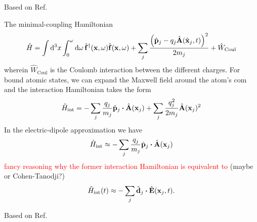 Based on Ref.~\cite[p.~48]{Vogel2006}

The minimal-coupling Hamiltonian
\begin{equation}
	\hat{H}
	=
	\int\dd[3]{x}
	\int_0^\omega\dd{\omega}
	\hat{\vb{f}}^\dagger(\vb{x},\omega)
	\hat{\vb{f}}(\vb{x},\omega)
	+
	\sum_j\frac{\left(\hat{\vb{p}}_j-q_j\hat{\vb{A}}(\hat{\vb{x}}_j,t)\right)^2}{2m_j}
	+
	\hat{W}_\text{Coul}
\end{equation}
wherein $\hat{W}_\text{Coul}$ is the Coulomb interaction between the different charges.
For bound atomic states, we can expand the Maxwell field around the atom's \gls{com} and the interaction Hamiltonian takes the form
\begin{equation}
	\hat{H}_\text{int}
	=
	-
	\sum_j\frac{q_j}{m_j}
	\hat{\vb{p}}_j
	\vdot
	\hat{\vb{A}}(\vb{x}_j)
	+
	\sum_j\frac{q_j^2}{2m_j}
	\hat{\vb{A}}(\vb{x}_j)^2
\end{equation}
In the electric-dipole approximation we have
\begin{equation}
	\hat{H}_\text{int}
	\approx
	-
	\sum_j\frac{q_j}{m_j}
	\hat{\vb{p}}_j
	\vdot
	\hat{\vb{A}}(\vb{x}_j)	
\end{equation}
\textcolor{red}{fancy reasoning why the former interaction Hamiltonian is equivalent to} (maybe \cite[p.~691]{Mandel1995} or Cohen-Tanodji?)
\begin{equation}
	\hat{H}_\text{int}(t)
	\approx
	-
	\sum_j
	\hat{\vb{d}}_j
	\vdot
	\hat{\vb{E}}(\vb{x}_j,t)
	.
\end{equation}

Based on Ref.~\cite[p.~173]{Vogel2006}

